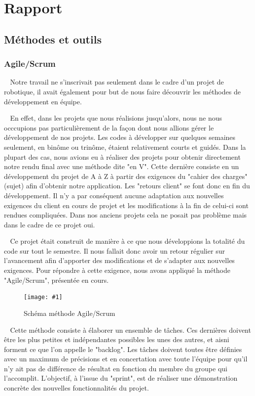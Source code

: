 \documentclass[12pt]{article}
\def\tab{$\>\>\>\>$}
\newcommand\img[2]{
\begin{figure}[!h]
  \centering
    \texttt{[image: \#1]}
  \caption{#2}
  \label{img:#1}
\end{figure}
}
\begin{document}
\newpage
\section{Rapport}
\subsection{Méthodes et outils}
\subsubsection{Agile/Scrum}

\tab Notre travail ne s'inscrivait pas seulement dans le cadre d'un projet de robotique, il avait également pour but de nous faire découvrir les méthodes de développement en équipe.

\tab En effet, dans les projets que nous réalisions jusqu'alors, nous ne nous occcupions pas particulièrement de la façon dont nous allions gérer le développement de nos projets. Les codes à développer sur quelques semaines seulement, en binôme ou trinôme, étaient relativement courts et guidés. Dans la plupart des cas, nous avions eu à réaliser des projets pour obtenir directement notre rendu final avec une méthode dite "en V". Cette dernière consiste en un développement du projet de A à Z à partir des exigences du "cahier des charges" (sujet) afin d'obtenir notre application. Les "retours client" se font donc en fin du développement. Il n'y a par conséquent aucune adaptation aux nouvelles exigences du client en cours de projet et les modifications à la fin de celui-ci sont rendues compliquées. Dans nos anciens projets cela ne posait pas problème mais dans le cadre de ce projet oui.

\tab Ce projet était construit de manière à ce que nous développions la totalité du code sur tout le semestre. Il nous fallait donc avoir un retour régulier sur l'avancement afin d'apporter des modifications et de s'adapter aux nouvelles exigences. Pour répondre à cette exigence, nous avons appliqué la méthode "Agile/Scrum", présentée en cours.

\img{Images/VueGlobaleScrum.png}{Schéma méthode Agile/Scrum}

\tab Cette méthode consiste à élaborer un ensemble de tâches. Ces dernières doivent être les plus petites et indépendantes possibles les unes des autres, et aisni forment ce que l'on appelle le "backlog". Les tâches doivent toutes être définies avec un maximum de précisions et en concertation avec toute l'équipe pour qu'il n'y ait pas de différence de résultat en fonction du membre du groupe qui l'accomplit. L'objectif, à l'issue du "sprint", est de réaliser une démonstration concrète des nouvelles fonctionnalités du projet.
\end{document}
